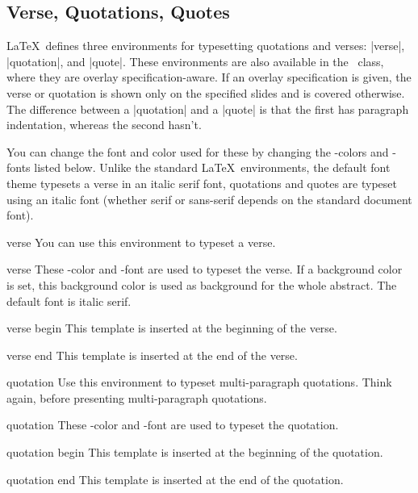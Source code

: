 \subsection{Verse, Quotations, Quotes}

\LaTeX\ defines three environments for typesetting quotations and verses: |verse|, |quotation|, and |quote|. These environments are also available in the \beamer\ class, where they are overlay specification-aware. If an overlay specification is given, the verse or quotation is shown only on the specified slides and is covered otherwise. The difference between a |quotation| and a |quote| is that the first has paragraph indentation, whereas the second hasn't.

You can change the font and color used for these by changing the \beamer-colors and -fonts listed below. Unlike the standard \LaTeX\ environments, the default font theme typesets a verse in an italic serif font, quotations and quotes are typeset using an italic font (whether serif or sans-serif depends on the standard document font).

\begin{environment}{{verse}}
  You can use this environment to typeset a verse.

  \begin{element}{verse}\no\yes\yes
    These \beamer-color and -font are used to typeset the verse. If a background color is set, this background color is used as background for the whole abstract. The default font is italic serif.
  \end{element}

  \begin{element}{verse begin}\yes\no\no
    This template is inserted at the beginning of the verse.
  \end{element}

  \begin{element}{verse end}\yes\no\no
    This template is inserted at the end of the verse.
  \end{element}
\end{environment}

\begin{environment}{{quotation}}
  Use this environment to typeset multi-paragraph quotations. Think again, before presenting multi-paragraph quotations.

  \begin{element}{quotation}\no\yes\yes
    These \beamer-color and -font are used to typeset the quotation.
  \end{element}

  \begin{element}{quotation begin}\yes\no\no
    This template is inserted at the beginning of the quotation.
  \end{element}

  \begin{element}{quotation end}\yes\no\no
    This template is inserted at the end of the quotation.
  \end{element}
\end{environment}


